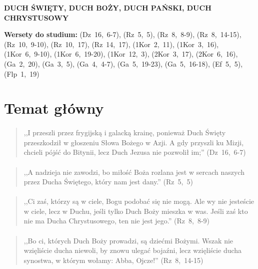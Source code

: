 \documentclass[10pt,a4paper,oneside]{article}
\begin{document}
\centerline{\textbf{\MakeUppercase{Duch Święty, Duch Boży, Duch Pański, Duch Chrystusowy}}}
\begin{center}
\textbf{Wersety do studium:} \mbox{(Dz 16, 6-7)}, \mbox{(Rz 5, 5)}, \mbox{(Rz 8, 8-9)}, \mbox{(Rz 8, 14-15)}, \mbox{(Rz 10, 9-10)}, \mbox{(Rz 10, 17)}, \mbox{(Rz 14, 17)}, \mbox{(1Kor 2, 11)}, \mbox{(1Kor 3, 16)}, \mbox{(1Kor 6, 9-10)}, \mbox{(1Kor 6, 19-20)}, \mbox{(1Kor 12, 3)}, \mbox{(2Kor 3, 17)}, \mbox{(2Kor 6, 16)}, \mbox{(Ga 2, 20)}, \mbox{(Ga 3, 5)}, \mbox{(Ga 4, 4-7)}, \mbox{(Ga 5, 19-23)}, \mbox{(Ga 5, 16-18)}, \mbox{(Ef 5, 5)}, \mbox{(Flp 1, 19)}
\end{center}
\section{Temat główny}
\paragraph{}
\begin{quote}
,,I przeszli przez frygijską i galacką krainę, ponieważ Duch Święty przeszkodził w głoszeniu Słowa Bożego w Azji. A gdy przyszli ku Mizji, chcieli pójść do Bitynii, lecz Duch Jezusa nie pozwolił im;'' \mbox{(Dz 16, 6-7)}
\end{quote}
\paragraph{}
\begin{quote}
,,A nadzieja nie zawodzi, bo miłość Boża rozlana jest w sercach naszych przez Ducha Świętego, który nam jest dany.'' \mbox{(Rz 5, 5)}
\end{quote}
\paragraph{}
\begin{quote}
,,Ci zaś, którzy są w ciele, Bogu podobać się nie mogą. Ale wy nie jesteście w ciele, lecz w Duchu, jeśli tylko Duch Boży mieszka w was. Jeśli zaś kto nie ma Ducha Chrystusowego, ten nie jest jego.'' \mbox{(Rz 8, 8-9)}
\end{quote}
\paragraph{}
\begin{quote}
,,Bo ci, których Duch Boży prowadzi, są dziećmi Bożymi. Wszak nie wzięliście ducha niewoli, by znowu ulegać bojaźni, lecz wzięliście ducha synostwa, w którym wołamy: Abba, Ojcze!'' \mbox{(Rz 8, 14-15)}
\end{quote}
\end{document}
